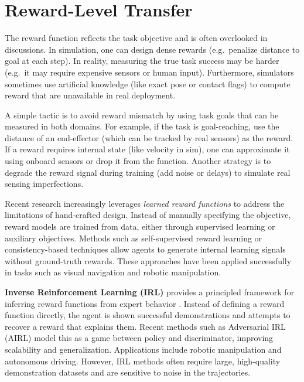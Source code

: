 \section{Reward-Level Transfer}
The reward function reflects the task objective and is often overlooked in \simtoreal discussions. In simulation, one can design dense rewards (e.g.\ penalize distance to goal at each step). In reality, measuring the true task success may be harder (e.g.\ it may require expensive sensors or human input). Furthermore, simulators sometimes use artificial knowledge (like exact pose or contact flags) to compute reward that are unavailable in real deployment.

A simple tactic is to avoid reward mismatch by using task goals that can be measured in both domains. For example, if the task is goal-reaching, use the distance of an end-effector (which can be tracked by real sensors) as the reward. If a reward requires internal state (like velocity in sim), one can approximate it using onboard sensors or drop it from the function. Another strategy is to degrade the reward signal during training (add noise or delays) to simulate real sensing imperfections.

Recent research increasingly leverages \textit{learned reward functions} to address the limitations of hand-crafted design. Instead of manually specifying the objective, reward models are trained from data, either through supervised learning or auxiliary objectives. Methods such as self-supervised reward learning \cite{Eysenbach2021} or consistency-based techniques \cite{Sharma2022} allow agents to generate internal learning signals without ground-truth rewards. These approaches have been applied successfully in tasks such as visual navigation and robotic manipulation.

\textbf{Inverse Reinforcement Learning (IRL)} provides a principled framework for inferring reward functions from expert behavior \cite{Ng2000}. Instead of defining a reward function directly, the agent is shown successful demonstrations and attempts to recover a reward that explains them. Recent methods such as Adversarial IRL (AIRL) \cite{Fu2018} model this as a game between policy and discriminator, improving scalability and generalization. Applications include robotic manipulation and autonomous driving. However, IRL methods often require large, high-quality demonstration datasets and are sensitive to noise in the trajectories.

